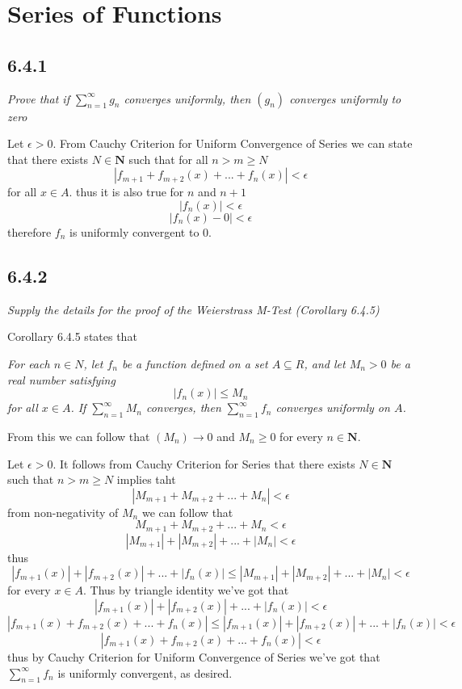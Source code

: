 \documentclass[11pt,oneside,titlepage]{book}
\begin{document}
\section{Series of Functions }

\subsection*{6.4.1}
\textit{Prove that if $\sum_{n = 1}^{\infty}{g_n}$ converges uniformly, then
  $(g_n)$ converges uniformly to zero}

Let $\epsilon > 0$. From Cauchy Criterion for Uniform Convergence of Series we
can state that there exists $N \in \textbf{N}$ such that for all $n > m \geq N$
$$|f_{m + 1} + f_{m + 2}(x) + ... + f_n(x)| < \epsilon$$
for all $x \in A$. 
thus it is also true for $n$ and $n + 1$
$$|f_n(x)| < \epsilon$$
$$|f_n(x) - 0| < \epsilon$$
therefore $f_n$ is uniformly convergent to $0$.

\subsection*{6.4.2}
\textit{Supply the details for the proof of the Weierstrass M-Test
  (Corollary 6.4.5)}

Corollary 6.4.5 states that

\textit{For each $n \in N$, let $f_n$ be a function defined on a set
  $A \subseteq R$, and let $M_n > 0$ be a real number satisfying }
$$|f_n(x)| \leq M_n$$
\textit{for all $x \in A$. If $\sum_{n = 1}^{\infty}M_n$ converges, then
  $\sum_{n = 1}^{\infty}f_n$ converges uniformly on $A$.}

From this we can follow that $(M_n) \to 0$ and 
$M_n \geq 0$ for every $n \in \textbf{N}$.

Let $\epsilon > 0$. It follows from Cauchy Criterion for Series that there
exists $N \in \textbf{N}$ such that $n >  m \geq N$ implies taht
$$|M_{m + 1} + M_{m + 2} + ... + M_n| < \epsilon$$
from non-negativity of $M_n$ we can follow that
$$M_{m + 1} + M_{m + 2} + ... + M_n < \epsilon$$
$$|M_{m + 1}| + |M_{m + 2}| + ... + |M_n| < \epsilon$$
thus
$$|f_{m + 1}(x)| + |f_{m + 2}(x)| + ... + |f_n(x)|
\leq |M_{m + 1}| + |M_{m + 2}| + ... + |M_n| < \epsilon$$
for every $x \in A$. Thus by triangle identity we've got that
$$|f_{m + 1}(x)| + |f_{m + 2}(x)| + ... + |f_n(x)| < \epsilon$$
$$|f_{m + 1}(x) + f_{m + 2}(x) + ... + f_n(x)|
\leq |f_{m + 1}(x)| + |f_{m + 2}(x)| + ... + |f_n(x)| < \epsilon$$
$$|f_{m + 1}(x) + f_{m + 2}(x) + ... + f_n(x)|  < \epsilon$$
thus by Cauchy Criterion for Uniform Convergence of Series we've got that
$\sum_{n = 1}^{\infty}{f_n}$ is uniformly convergent, as desired.
\end{document}
